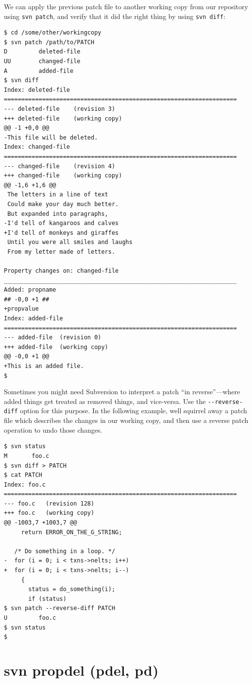 We can apply the previous patch file to another working copy from our
repository using \texttt{svn\ patch}, and verify that it did the right
thing by using \texttt{svn\ diff}:

\begin{verbatim}
$ cd /some/other/workingcopy
$ svn patch /path/to/PATCH
D         deleted-file
UU        changed-file
A         added-file
$ svn diff
Index: deleted-file
===================================================================
--- deleted-file    (revision 3)
+++ deleted-file    (working copy)
@@ -1 +0,0 @@
-This file will be deleted.
Index: changed-file
===================================================================
--- changed-file    (revision 4)
+++ changed-file    (working copy)
@@ -1,6 +1,6 @@
 The letters in a line of text
 Could make your day much better.
 But expanded into paragraphs,
-I'd tell of kangaroos and calves
+I'd tell of monkeys and giraffes
 Until you were all smiles and laughs
 From my letter made of letters.

Property changes on: changed-file
___________________________________________________________________
Added: propname
## -0,0 +1 ##
+propvalue
Index: added-file
===================================================================
--- added-file  (revision 0)
+++ added-file  (working copy)
@@ -0,0 +1 @@
+This is an added file.
$
\end{verbatim}

Sometimes you might need Subversion to interpret a patch ``in
reverse''---where added things get treated as removed things, and
vice-versa. Use the \texttt{-\/-reverse-diff} option for this purpose.
In the following example, we\textquotesingle ll squirrel away a patch
file which describes the changes in our working copy, and then use a
reverse patch operation to undo those changes.

\begin{verbatim}
$ svn status
M       foo.c
$ svn diff > PATCH
$ cat PATCH
Index: foo.c
===================================================================
--- foo.c   (revision 128)
+++ foo.c   (working copy)
@@ -1003,7 +1003,7 @@
     return ERROR_ON_THE_G_STRING;
 
   /* Do something in a loop. */
-  for (i = 0; i < txns->nelts; i++)
+  for (i = 0; i < txns->nelts; i--)
     {
       status = do_something(i);
       if (status)
$ svn patch --reverse-diff PATCH
U         foo.c
$ svn status
$
\end{verbatim}

\section{svn propdel (pdel, pd)}\label{svn.ref.svn.c.propdel}

